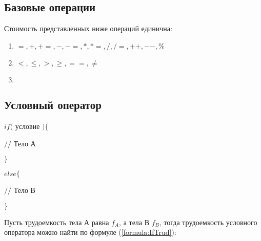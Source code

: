     \subsection{Базовые операции}
    \par Стоимость представленных ниже операций единична:

    \begin{enumerate}
        \item \begin{math} =, +, +=, -, -=, *, *=, /, /=, ++, --, \% \end{math}
        \item \begin{math} <, \leqslant, >, \geqslant, ==, \neq \end{math}
        \item \begin{math} [ ] \end{math}
    \end{enumerate}

    \subsection{Условный оператор}

    \par \begin{math}if(\end{math} условие \begin{math}) \{\end{math}
    \par \begin{math} //\end{math} Тело А
    \par \begin{math}\}\end{math}
    \par \begin{math}else \{\end{math}
    \par \begin{math}//\end{math} Тело В
    \par \begin{math}\}\end{math}
    \par Пусть трудоемкость тела А равна \begin{math}f_A\end{math}, а тела В \begin{math}f_B\end{math}, тогда трудоемкость условного оператора можно найти по формуле (\ref{formula:IfTrud}):

